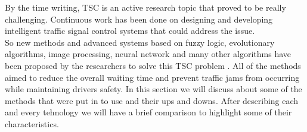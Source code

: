\documentclass[17pt]{article}
\begin{document}
\indent \indent
By the time writing, TSC is an active research topic that proved to be really
challenging. Continuous work has been done on designing and developing
intelligent traffic signal control systems that could address the issue.\\
\indent \indent
So new methods and advanced systems based on fuzzy logic, evolutionary
algorithms, image processing, neural network and many other algorithms have
been proposed by the researchers to solve this TSC problem \cite{Tomar2022}.
All of the methods aimed to reduce the overall waiting time and prevent traffic
jams from occurring while maintaining drivers safety. In this section we will
discuss about some of the methods that were put in to use and their ups and
downs. After describing each and every tehnology we will have a brief
comparison to highlight some of their characteristics.

\pagebreak
\end{document}
